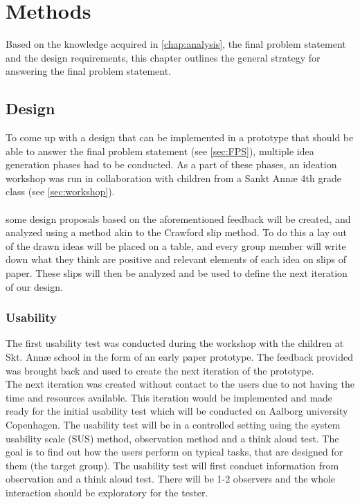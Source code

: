 \chapter{Methods}\label{chap:methods}
Based on the knowledge acquired in \autoref{chap:analysis}, the final problem statement and the design requirements, this chapter outlines the general strategy for answering the final problem statement.
\section{Design}\label{designMethod}
To come up with a design that can be implemented in a prototype that should be able to answer the final problem statement (see \autoref{sec:FPS}), multiple idea generation phases had to be conducted. As a part of these phases, an ideation workshop was run in collaboration with children from a Sankt Annæ 4th grade class (see \autoref{sec:workshop}).\\\\
some design proposals based on the aforementioned feedback will be created, and analyzed using a method akin to the Crawford slip method\cite{crawfordSlip}. To do this a lay out of the drawn ideas will be placed on a table, and every group member will write down what they think are positive and relevant elements of each idea on slips of paper. These slips will then be analyzed and be used to define the next iteration of our design.

\subsection{Usability}
The first usability test was conducted during the workshop with the children at Skt. Annæ school in the form of an early paper prototype. The feedback provided was brought back and used to create the next iteration of the prototype. \\
The next iteration was created without contact to the users due to not having the time and resources available. This iteration would be implemented and made ready for the initial usability test which will be conducted on Aalborg university Copenhagen.
The usability test will be in a controlled setting using the system usability scale (SUS) method, observation method and a think aloud test. The goal is to find out how the users perform on typical tasks, that are designed for them (the target group). 
The usability test will first conduct information from observation and a think aloud test. There will be 1-2 observers and the whole interaction should be exploratory for the tester.
	
